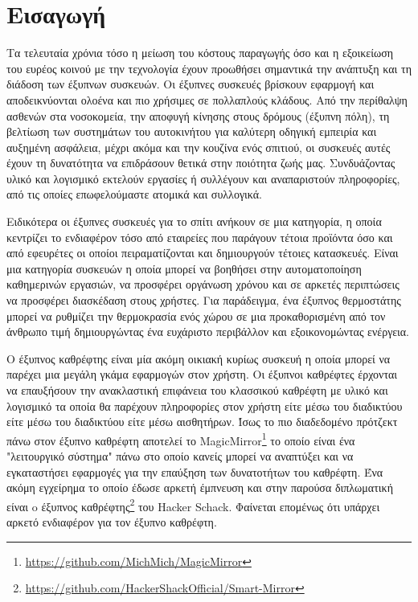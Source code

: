 \chapter{Εισαγωγή}
\label{chapter:intro}

\setlength{\parskip}{1em}
Τα τελευταία χρόνια τόσο η μείωση του κόστους παραγωγής όσο και η εξοικείωση του ευρέος κοινού με την τεχνολογία έχουν προωθήσει σημαντικά την ανάπτυξη και τη διάδοση των έξυπνων συσκευών. Οι έξυπνες συσκευές βρίσκουν εφαρμογή και αποδεικνύονται ολοένα και πιο χρήσιμες σε πολλαπλούς κλάδους. Από την περίθαλψη ασθενών στα νοσοκομεία, την αποφυγή κίνησης στους δρόμους (έξυπνη πόλη), τη βελτίωση των συστημάτων του αυτοκινήτου για καλύτερη οδηγική εμπειρία και αυξημένη ασφάλεια, μέχρι ακόμα και την κουζίνα ενός σπιτιού, οι συσκευές αυτές έχουν τη δυνατότητα να επιδράσουν θετικά στην ποιότητα ζωής μας. Συνδυάζοντας υλικό και λογισμικό εκτελούν εργασίες ή συλλέγουν και αναπαριστούν πληροφορίες, από τις οποίες επωφελούμαστε ατομικά και συλλογικά. 

Ειδικότερα οι έξυπνες συσκευές για το σπίτι ανήκουν σε μια κατηγορία, η οποία κεντρίζει το ενδιαφέρον τόσο από εταιρείες που παράγουν τέτοια προϊόντα όσο και από εφευρέτες οι οποίοι πειραματίζονται και δημιουργούν τέτοιες κατασκευές. Είναι μια κατηγορία συσκευών η οποία μπορεί να βοηθήσει στην αυτοματοποίηση καθημερινών εργασιών, να προσφέρει οργάνωση χρόνου και σε αρκετές περιπτώσεις να προσφέρει διασκέδαση στους χρήστες. Για παράδειγμα, ένα έξυπνος θερμοστάτης μπορεί να ρυθμίζει την θερμοκρασία ενός χώρου σε μια προκαθορισμένη από τον άνθρωπο τιμή δημιουργώντας ένα ευχάριστο περιβάλλον και εξοικονομώντας ενέργεια.

Ο έξυπνος καθρέφτης είναι μία ακόμη οικιακή κυρίως συσκευή η οποία μπορεί να παρέχει μια μεγάλη γκάμα εφαρμογών στον χρήστη. Οι έξυπνοι καθρέφτες έρχονται να επαυξήσουν την ανακλαστική επιφάνεια του κλασσικού καθρέφτη με υλικό και λογισμικό τα οποία θα παρέχουν πληροφορίες στον χρήστη είτε μέσω του διαδικτύου είτε μέσω του διαδικτύου είτε μέσω αισθητήρων. Ίσως το πιο διαδεδομένο πρότζεκτ πάνω στον έξυπνο καθρέφτη αποτελεί το MagicMirror\footnote{\href{https://github.com/MichMich/MagicMirror}{https://github.com/MichMich/MagicMirror}} το οποίο είναι ένα "λειτουργικό σύστημα" πάνω στο οποίο κανείς μπορεί να αναπτύξει και να εγκαταστήσει εφαρμογές για την επαύξηση των δυνατοτήτων του καθρέφτη. Ένα ακόμη εγχείρημα το οποίο έδωσε αρκετή έμπνευση και στην παρούσα διπλωματική είναι o έξυπνος καθρέφτης\footnote{\href{https://github.com/HackerShackOfficial/Smart-Mirror}{https://github.com/HackerShackOfficial/Smart-Mirror}} του Hacker Schack. Φαίνεται επομένως ότι υπάρχει αρκετό ενδιαφέρον για τον έξυπνο καθρέφτη.




